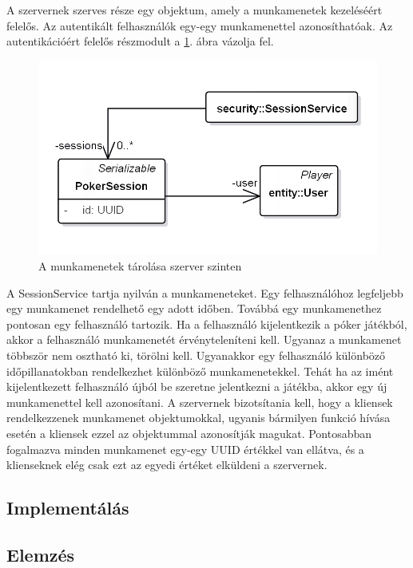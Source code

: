A szervernek szerves része egy objektum, amely a munkamenetek kezeléséért felelős. Az autentikált felhasználók egy-egy munkamenettel azonosíthatóak. Az autentikációért felelős részmodult a \ref{fig:sessionservice}. ábra vázolja fel.
\begin{figure}[h!]
	\caption{A munkamenetek tárolása szerver szinten}
	\label{fig:sessionservice}
	\centering
	\includegraphics[width=\linewidth]{developer-documentation/images/session.png}
\end{figure}
A SessionService tartja nyilván a munkameneteket. Egy felhasználóhoz legfeljebb egy munkamenet rendelhető egy adott időben. Továbbá egy munkamenethez pontosan egy felhasználó tartozik. Ha a felhasználó kijelentkezik a póker játékból, akkor a felhasználó munkamenetét érvényteleníteni kell. Ugyanaz a munkamenet többször nem osztható ki, törölni kell. Ugyanakkor egy felhasználó különböző időpillanatokban rendelkezhet különböző munkamenetekkel. Tehát ha az imént kijelentkezett felhasználó újból be szeretne jelentkezni a játékba, akkor egy új munkamenettel kell azonosítani. A szervernek bizotsítania kell, hogy a kliensek rendelkezzenek munkamenet objektumokkal, ugyanis bármilyen funkció hívása esetén a kliensek ezzel az objektummal azonosítják magukat. Pontosabban fogalmazva minden munkamenet egy-egy UUID értékkel van ellátva, és a klienseknek elég csak ezt az egyedi értéket elküldeni a szervernek.
\subsection{Implementálás}
\subsection{Elemzés}

